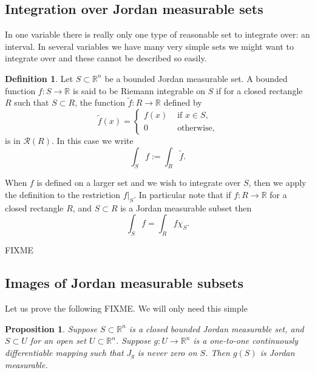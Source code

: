 \documentclass[12pt]{book}
\newcommand{\R}{{\mathbb{R}}}
\newcommand{\sR}{{\mathcal{R}}}
\theoremstyle{plain}
\newtheorem{prop}[thm]{Proposition}
\theoremstyle{remark}
\theoremstyle{definition}
\newtheorem{defn}[thm]{Definition}
\theoremstyle{exercise}
\theoremstyle{example}
\begin{document}
\subsection{Integration over Jordan measurable sets}

In one variable there is really only one type of reasonable set to integrate over:
an interval.   In several variables we have many very simple sets we might
want to integrate over and these cannot be described so easily.

\begin{defn}
Let $S \subset \R^n$ be a bounded Jordan measurable set.
A bounded function $f \colon S \to \R$
is said to be Riemann integrable on $S$ if for a closed rectangle $R$
such that $S \subset R$, the function $\widetilde{f} \colon R \to \R$
defined  by
\begin{equation*}
\widetilde{f}(x) =
\begin{cases}
f(x) & \text{ if $x \in S$}, \\
0 & \text{ otherwise},
\end{cases}
\end{equation*}
is in $\sR(R)$.  In this case we write
\begin{equation*}
\int_S f := \int_R \widetilde{f}.
\end{equation*}
\end{defn}

When $f$ is defined on a larger set and we wish to integrate over $S$, then
we apply the definition to the restriction $f|_S$.  In particular note that
if $f \colon R \to \R$ for a closed rectangle $R$, and $S \subset R$ is
a Jordan measurable subset then
\begin{equation*}
\int_S f = \int_R f \chi_S .
\end{equation*}

FIXME

\subsection{Images of Jordan measurable subsets}

Let us prove the following FIXME.  We will only need this simple

\begin{prop}
Suppose $S \subset \R^n$ is a closed bounded Jordan measurable set,
and $S \subset U$ for an open set $U \subset \R^n$.
Suppose
$g \colon U \to \R^n$ is a one-to-one
continuously differentiable mapping such that
$J_g$ is never zero on $S$.
Then $g(S)$ is Jordan measurable.
\end{prop}
\end{document}
